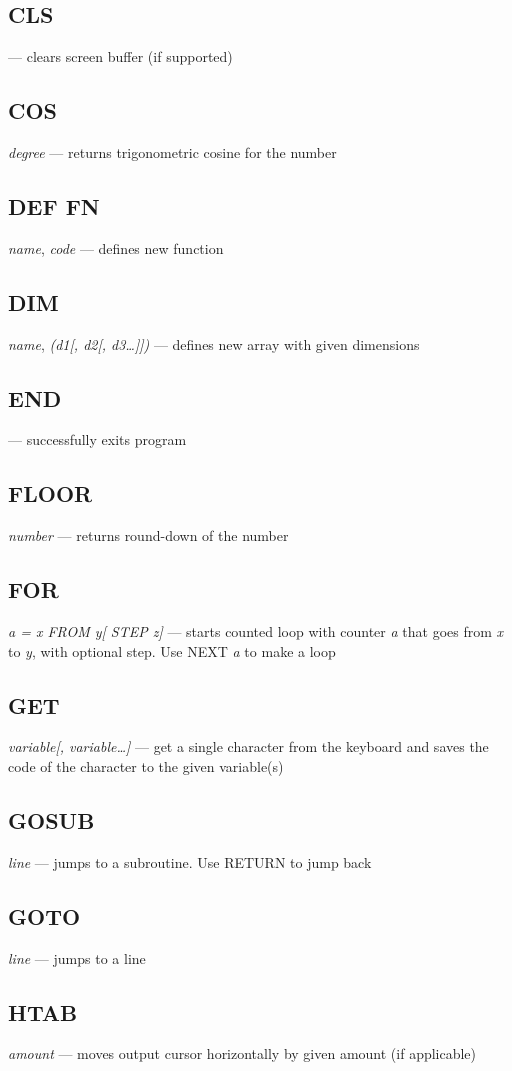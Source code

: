 \subsection{CLS} --- clears screen buffer (if supported)
\subsection{COS} \emph{degree} --- returns trigonometric cosine for the number
\subsection{DEF FN} \emph{name}, \emph{code} --- defines new function
\subsection{DIM} \emph{name}, \emph{(d1[, d2[, d3\ldots]])} --- defines new array with given dimensions
\subsection{END} --- successfully exits program
\subsection{FLOOR} \emph{number} --- returns round-down of the number
\subsection{FOR} \emph{a = x FROM y[ STEP z]} --- starts counted loop with counter \emph{a} that goes from \emph{x} to \emph{y}, with optional step. Use NEXT \emph{a} to make a loop
\subsection{GET} \emph{variable[, variable\ldots]} --- get a single character from the keyboard and saves the code of the character to the given variable(s)
\subsection{GOSUB} \emph{line} --- jumps to a subroutine. Use RETURN to jump back
\subsection{GOTO} \emph{line} --- jumps to a line
\subsection{HTAB} \emph{amount} --- moves output cursor horizontally by given amount (if applicable)
